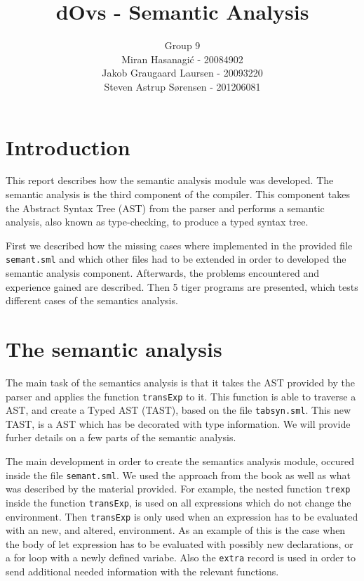\documentclass{article}
\title{dOvs - Semantic Analysis}
\author{
  Group 9 \\
  Miran Hasanagi\'{c} - 20084902 \\
  Jakob Graugaard Laursen - 20093220\\
  Steven Astrup S\o rensen - 201206081
}
\begin{document}
\maketitle

\section{Introduction}
This report describes how the semantic analysis module was developed. The semantic analysis is the third component of the compiler. This component takes the Abstract Syntax Tree (AST) from the parser and performs a semantic analysis, also known as type-checking, to produce a typed syntax tree. 

First we described how the missing cases where implemented in the provided file \texttt{semant.sml} and which other files had to be extended in order to developed the semantic analysis component. Afterwards, the problems encountered and experience gained are described. Then 5 tiger programs are presented, which tests different cases of the semantics analysis.


\section{The semantic analysis}
The main task of the semantics analysis is that it takes the AST provided by the parser and applies the function \texttt{transExp} to it. This function is able to traverse a AST, and create a Typed AST (TAST), based on the file \texttt{tabsyn.sml}. This new TAST, is a AST which has be decorated with type information. We will provide furher details
on a few parts of the semantic analysis.

The main development in order to create the semantics analysis module, occured inside the file \texttt{semant.sml}. We used the approach from the book as well as 
what was described by the material provided. For example, the nested function \texttt{trexp} inside the function \texttt{transExp}, is used on all expressions which do not change the environment. Then \texttt{transExp} is only used when an expression has to be evaluated with an new, and altered, environment. As an example of this is the case when the body of let expression has to be evaluated with possibly new declarations, or a for loop with a newly defined variabe. Also the \texttt{extra} record is used in order to send additional needed information with the relevant functions.
\end{document}
